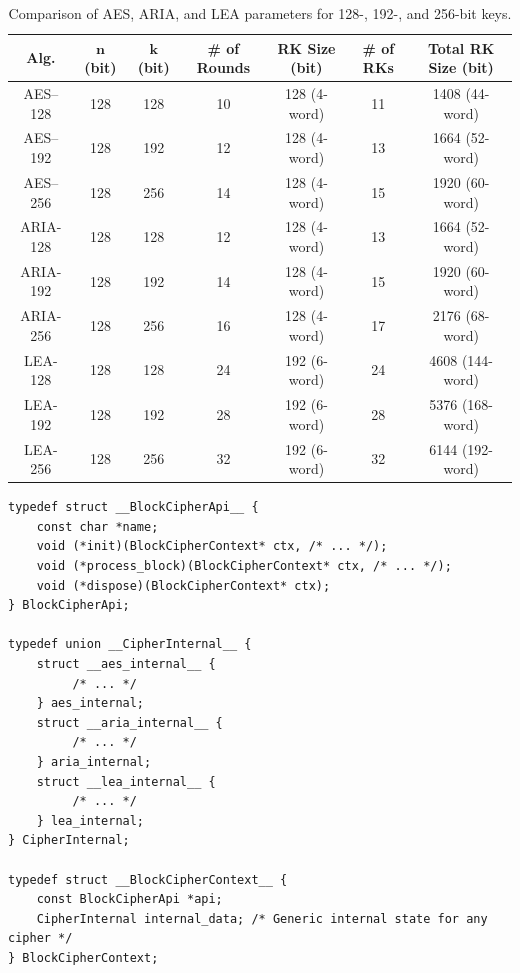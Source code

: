 \documentclass[11pt,a4paper]{report}
\theoremstyle{definitionstyle}
\begin{document}
\begin{table}[h!]
	\centering{}
	\begin{tabular*}{\textwidth}{@{\extracolsep{\fill}}ccccccc}
		\hline
		\textbf{Alg.} & $\boldsymbol{n}$ (bit) & $\boldsymbol{k}$ (bit) & \textbf{\# of Rounds} & \textbf{RK Size} (bit) & \textbf{\# of RKs} & \textbf{Total RK Size} (bit) \\
		\hline
		\textsf{AES--128} & 128 & 128 & 10 & 128 (4-word) & 11 & 1408 (44-word) \\
		\textsf{AES--192} & 128 & 192 & 12 & 128 (4-word) & 13 & 1664 (52-word)\\
		\textsf{AES--256} & 128 & 256 & 14 & 128 (4-word) & 15 & 1920 (60-word)\\
		\hline
		\textsf{ARIA-128} & 128 & 128 & 12 & 128 (4-word) & 13 & 1664 (52-word)\\
		\textsf{ARIA-192} & 128 & 192 & 14 & 128 (4-word) & 15 & 1920 (60-word)\\
		\textsf{ARIA-256} & 128 & 256 & 16 & 128 (4-word) & 17 & 2176 (68-word)\\
		\hline
		\textsf{LEA-128} & 128 & 128 & 24 & 192 (6-word) & 24 & 4608 (144-word)\\
		\textsf{LEA-192} & 128 & 192 & 28 & 192 (6-word) & 28 & 5376 (168-word)\\
		\textsf{LEA-256} & 128 & 256 & 32 & 192 (6-word) & 32 & 6144 (192-word)\\
		\hline
	\end{tabular*}
	\caption{Comparison of AES, ARIA, and LEA parameters for 128-, 192-, and 256-bit keys. 
	}
	\label{tab:cipher-comparison}
\end{table}
\newpage
\begin{lstlisting}[style=cstyle]
typedef struct __BlockCipherApi__ {
	const char *name;
	void (*init)(BlockCipherContext* ctx, /* ... */);
	void (*process_block)(BlockCipherContext* ctx, /* ... */);
	void (*dispose)(BlockCipherContext* ctx);
} BlockCipherApi;

typedef union __CipherInternal__ {
	struct __aes_internal__ {
		 /* ... */
	} aes_internal;
	struct __aria_internal__ {
		 /* ... */ 
	} aria_internal;
	struct __lea_internal__ {
		 /* ... */
	} lea_internal;
} CipherInternal;

typedef struct __BlockCipherContext__ {
	const BlockCipherApi *api;  
	CipherInternal internal_data; /* Generic internal state for any cipher */
} BlockCipherContext;
\end{lstlisting}
\end{document}
